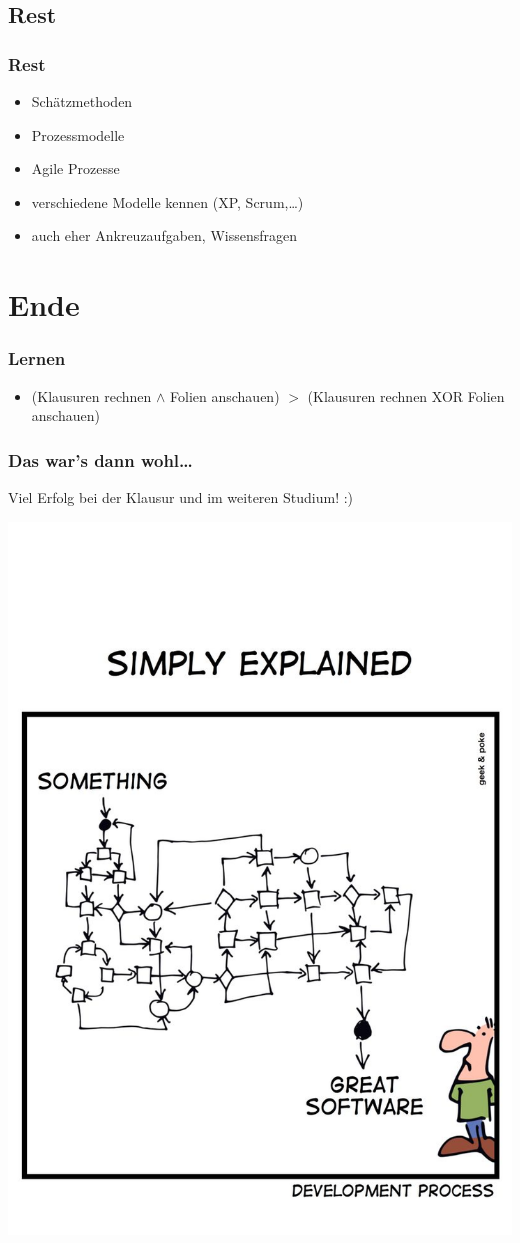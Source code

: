 \documentclass[18pt]{beamer}
\begin{document}
	\subsection{Rest}
	\begin{frame}
		\frametitle{Rest}
		\begin{itemize}
			\item Schätzmethoden \pause
			\item Prozessmodelle \pause
			\item Agile Prozesse \pause
			\item verschiedene Modelle kennen (XP, Scrum,\dots) \pause
			\item auch eher Ankreuzaufgaben, Wissensfragen
		\end{itemize}
	\end{frame}

\section{Ende}
	\begin{frame}
		\frametitle{Lernen}
		\begin{itemize}
			\item (Klausuren rechnen $\land$ Folien anschauen) \linebreak $>$ (Klausuren rechnen XOR Folien anschauen)
		\end{itemize}
	\end{frame}

	\begin{frame}
		\frametitle{Das war's dann wohl\dots}
		\centering
		\begin{large}
			Viel Erfolg bei der Klausur und im weiteren Studium! :)
		\end{large}
		\linebreak
		\includegraphics[scale=0.75]{./comics/geek_and_poke_development2.jpg}
	\end{frame}
\end{document}
